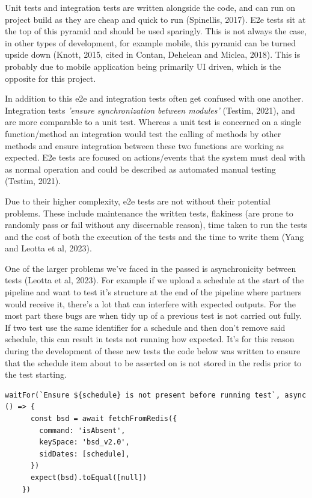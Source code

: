   Unit tests and integration tests are written alongside the code, and can run on project build as they are cheap and quick to run (Spinellis, 2017).
  E2e tests sit at the top of this pyramid and should be used sparingly. This is not always the case, in other types of development, for example mobile,
  this pyramid can be turned upside down (Knott, 2015, cited in Contan, Dehelean and Miclea, 2018). This is probably due to mobile application being 
  primarily UI driven, which is the opposite for this project.

  In addition to this e2e and integration tests often get confused with one another. Integration tests \textit{'ensure synchronization between modules'}
  (Testim, 2021), and are more comparable to a unit test. Whereas a unit test is concerned on a single function/method an integration would test the calling of 
  methods by other methods and ensure integration between these two functions are working as expected. E2e tests are focused on actions/events that the 
  system must deal with as normal operation and could be described as automated manual testing (Testim, 2021).
  
  Due to their higher complexity, e2e tests are not without their potential problems. These include maintenance the written 
  tests, flakiness (are prone to randomly pass or fail without any discernable reason), time taken to run the tests and the cost of both the 
  execution of the tests and the time to write them (Yang and Leotta et al, 2023). 

  One of the larger problems we've faced in the passed is asynchronicity between tests (Leotta et al, 2023). For example if we upload a schedule at the 
  start of the pipeline and want to test it's structure at the end of the pipeline where partners would receive it, there's a lot that can interfere with 
  expected outputs. For the most part these bugs are when tidy up of a previous test is not carried out fully. If two test use the same identifier 
  for a schedule and then don't remove said schedule, this can result in tests not running how expected. It's for this reason during the development 
  of these new tests the code below was written to ensure that the schedule item about to be asserted on is not stored in the redis prior to the 
  test starting.

  \begin{lstlisting}[caption=Code to ensure schedule to asserted on is not present at the start of the test.]
    waitFor(`Ensure ${schedule} is not present before running test`, async () => {
      const bsd = await fetchFromRedis({
        command: 'isAbsent',
        keySpace: 'bsd_v2.0',
        sidDates: [schedule],
      })
      expect(bsd).toEqual([null])
    })
  \end{lstlisting} 

